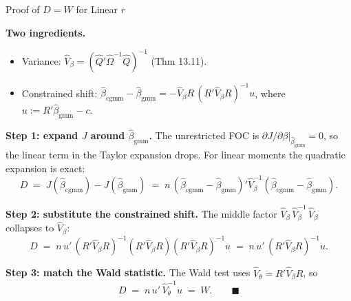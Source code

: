 \documentclass[aspectratio=169, handout]{beamer}
\numberwithin{equation}{section}
\begin{document}
\begin{frame}{Proof of $D = W$ for Linear $r$}

\textbf{Two ingredients.}
\begin{itemize}\itemsep=1pt
\item Variance: $\hat V_\beta = (\hat Q'\hat\Omega^{-1}\hat Q)^{-1}$ (Thm 13.11).
\item Constrained shift: $\hat\beta_{\text{cgmm}} - \hat\beta_{\text{gmm}} = -\hat V_\beta R\,(R'\hat V_\beta R)^{-1}u$, where $u := R'\hat\beta_{\text{gmm}} - c$.
\end{itemize}

\smallskip
\textbf{Step 1: expand $J$ around $\hat\beta_{\text{gmm}}$.} The unrestricted FOC is $\partial J/\partial \beta\big|_{\hat\beta_{\text{gmm}}} = 0$, so the linear term in the Taylor expansion drops. For linear moments the quadratic expansion is exact:
$$D \;=\; J(\hat\beta_{\text{cgmm}}) - J(\hat\beta_{\text{gmm}}) \;=\; n\,(\hat\beta_{\text{cgmm}} - \hat\beta_{\text{gmm}})'\hat V_\beta^{-1}(\hat\beta_{\text{cgmm}} - \hat\beta_{\text{gmm}}).$$

\medskip
\textbf{Step 2: substitute the constrained shift.} The middle factor $\hat V_\beta\,\hat V_\beta^{-1}\,\hat V_\beta$ collapses to $\hat V_\beta$:
$$D \;=\; n\,u'\,(R'\hat V_\beta R)^{-1}(R'\hat V_\beta R)(R'\hat V_\beta R)^{-1}u \;=\; n\,u'\,(R'\hat V_\beta R)^{-1}u.$$

\medskip
\textbf{Step 3: match the Wald statistic.} The Wald test uses $\hat V_\theta = R'\hat V_\beta R$, so
$$D \;=\; n\,u'\,\hat V_\theta^{-1}u \;=\; W. \qquad \blacksquare$$

\end{frame}
\end{document}
